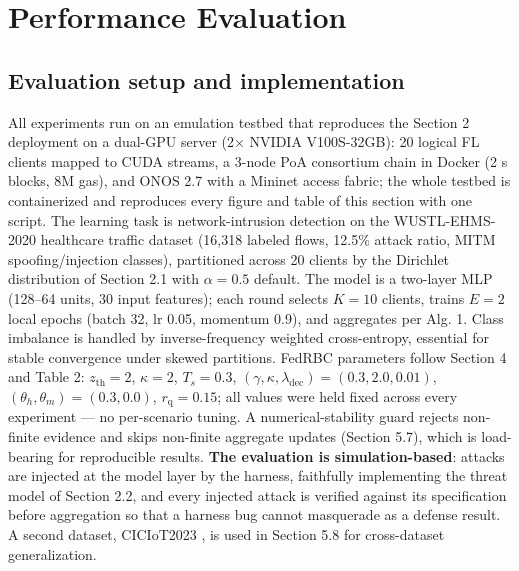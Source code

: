 \documentclass[cmc,article,submit,moreauthors,pdftex]{Definitions/tsp}
\begin{document}
\section{Performance Evaluation}\label{sec:performance-evaluation}

\subsection{Evaluation setup and implementation}\label{sec:evaluation-setup-and-implementation}

All experiments run on an emulation testbed that reproduces the Section 2 deployment on a dual-GPU server (2$\times$ NVIDIA V100S-32GB): 20 logical FL clients mapped to CUDA streams, a 3-node PoA consortium chain in Docker (2 s blocks, 8M gas), and ONOS 2.7 with a Mininet access fabric; the whole testbed is containerized and reproduces every figure and table of this section with one script. The learning task is network-intrusion detection on the WUSTL-EHMS-2020 healthcare traffic dataset (16,318 labeled flows, 12.5\% attack ratio, MITM spoofing/injection classes), partitioned across 20 clients by the Dirichlet distribution of Section 2.1 with $\alpha = 0.5$ default. The model is a two-layer MLP (128--64 units, 30 input features); each round selects $K{=}10$ clients, trains $E{=}2$ local epochs (batch 32, lr 0.05, momentum 0.9), and aggregates per Alg. 1. Class imbalance is handled by inverse-frequency weighted cross-entropy, essential for stable convergence under skewed partitions. FedRBC parameters follow Section 4 and Table 2: $z_{\mathrm{th}}{=}2$, $\kappa{=}2$, $T_s{=}0.3$, $(\gamma,\kappa,\lambda_{\mathrm{dec}})=(0.3,2.0,0.01)$, $(\theta_h,\theta_m)=(0.3,0.0)$, $r_{\mathrm{q}}{=}0.15$; all values were held fixed across every experiment --- no per-scenario tuning. A numerical-stability guard rejects non-finite evidence and skips non-finite aggregate updates (Section 5.7), which is load-bearing for reproducible results. \textbf{The evaluation is simulation-based}: attacks are injected at the model layer by the harness, faithfully implementing the threat model of Section 2.2, and every injected attack is verified against its specification before aggregation so that a harness bug cannot masquerade as a defense result. A second dataset, CICIoT2023 \cite{ref-6}, is used in Section 5.8 for cross-dataset generalization.
\end{document}
